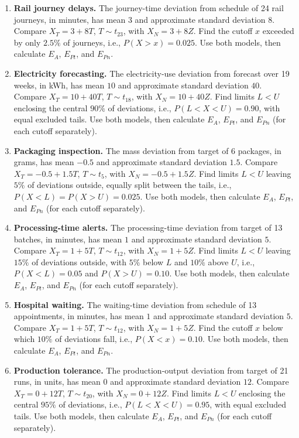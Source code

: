 \begin{enumerate}[leftmargin=*,label=\textbf{\arabic*.},itemsep=5pt,parsep=0pt,topsep=2pt]
		\item \textbf{Rail journey delays.} The journey-time deviation from schedule of 24 rail journeys, in minutes, has mean $3$ and approximate standard deviation $8$. Compare $X_T=3+8T$, $T\sim t_{23}$, with $X_N=3+8Z$. Find the cutoff $x$ exceeded by only $2.5\%$ of journeys, i.e., $P(X>x)=0.025$. Use both models, then calculate $E_A$, $E_{Pt}$, and $E_{Pn}$.
		\item \textbf{Electricity forecasting.} The electricity-use deviation from forecast over 19 weeks, in kWh, has mean $10$ and approximate standard deviation $40$. Compare $X_T=10+40T$, $T\sim t_{18}$, with $X_N=10+40Z$. Find limits $L<U$ enclosing the central $90\%$ of deviations, i.e., $P(L<X<U)=0.90$, with equal excluded tails. Use both models, then calculate $E_A$, $E_{Pt}$, and $E_{Pn}$ (for each cutoff separately).
		\item \textbf{Packaging inspection.} The mass deviation from target of 6 packages, in grams, has mean $-0.5$ and approximate standard deviation $1.5$. Compare $X_T=-0.5+1.5T$, $T\sim t_{5}$, with $X_N=-0.5+1.5Z$. Find limits $L<U$ leaving $5\%$ of deviations outside, equally split between the tails, i.e., $P(X<L)=P(X>U)=0.025$. Use both models, then calculate $E_A$, $E_{Pt}$, and $E_{Pn}$ (for each cutoff separately).
		\item \textbf{Processing-time alerts.} The processing-time deviation from target of 13 batches, in minutes, has mean $1$ and approximate standard deviation $5$. Compare $X_T=1+5T$, $T\sim t_{12}$, with $X_N=1+5Z$. Find limits $L<U$ leaving $15\%$ of deviations outside, with $5\%$ below $L$ and $10\%$ above $U$, i.e., $P(X<L)=0.05$ and $P(X>U)=0.10$. Use both models, then calculate $E_A$, $E_{Pt}$, and $E_{Pn}$ (for each cutoff separately).
		\item \textbf{Hospital waiting.} The waiting-time deviation from schedule of 13 appointments, in minutes, has mean $1$ and approximate standard deviation $5$. Compare $X_T=1+5T$, $T\sim t_{12}$, with $X_N=1+5Z$. Find the cutoff $x$ below which $10\%$ of deviations fall, i.e., $P(X<x)=0.10$. Use both models, then calculate $E_A$, $E_{Pt}$, and $E_{Pn}$.
		\newpage
		\item \textbf{Production tolerance.} The production-output deviation from target of 21 runs, in units, has mean $0$ and approximate standard deviation $12$. Compare $X_T=0+12T$, $T\sim t_{20}$, with $X_N=0+12Z$. Find limits $L<U$ enclosing the central $95\%$ of deviations, i.e., $P(L<X<U)=0.95$, with equal excluded tails. Use both models, then calculate $E_A$, $E_{Pt}$, and $E_{Pn}$ (for each cutoff separately).

\end{enumerate}
